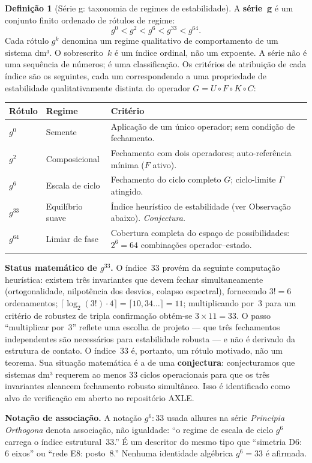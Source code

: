 \documentclass[12pt,a4paper,twoside]{book}
\theoremstyle{plain}
\theoremstyle{definition}
\theoremstyle{definition}
\newtheorem{definicao}[teorema]{Definição}
\begin{document}
\begin{definicao}[Série g: taxonomia de regimes de estabilidade]\label{def:g-series}
A \textbf{série~g} é um conjunto finito ordenado de rótulos de regime:
\[
  g^{0} < g^{2} < g^{6} < g^{33} < g^{64}.
\]
Cada rótulo $g^{k}$ denomina um regime qualitativo de comportamento de um sistema dm³.
O sobrescrito~$k$ é um índice ordinal, não um expoente. A série não é uma sequência
de números; é uma classificação. Os critérios de atribuição de cada índice são os
seguintes, cada um correspondendo a uma propriedade de estabilidade qualitativamente
distinta do operador $G = U \circ F \circ K \circ C$:

\medskip
\begin{center}
\small
\begin{tabular}{@{}lll@{}}
\toprule
\textbf{Rótulo} & \textbf{Regime} & \textbf{Critério} \\
\midrule
$g^{0}$ & Semente &
  Aplicação de um único operador; sem condição de fechamento. \\[3pt]
$g^{2}$ & Composicional &
  Fechamento com dois operadores; auto-referência mínima ($F$ ativo). \\[3pt]
$g^{6}$ & Escala de ciclo &
  Fechamento do ciclo completo $G$; ciclo-limite $\Gamma$ atingido. \\[3pt]
$g^{33}$ & Equilíbrio suave &
  Índice heurístico de estabilidade (ver Observação abaixo). \emph{Conjectura.} \\[3pt]
$g^{64}$ & Limiar de fase &
  Cobertura completa do espaço de possibilidades: $2^{6} = 64$
  combinações operador--estado. \\
\bottomrule
\end{tabular}
\end{center}

\medskip
\noindent\textbf{Status matemático de $g^{33}$.}
O índice~33 provém da seguinte computação heurística: existem três invariantes que
devem fechar simultaneamente (ortogonalidade, nilpotência dos desvios, colapso
espectral), fornecendo $3! = 6$ ordenamentos; $\lceil \log_{2}(3!)\cdot 4 \rceil =
\lceil 10{,}34\ldots \rceil = 11$; multiplicando por~3 para um critério de robustez
de tripla confirmação obtém-se $3 \times 11 = 33$. O passo ``multiplicar por~3''
reflete uma escolha de projeto --- que três fechamentos independentes são necessários
para estabilidade robusta --- e não é derivado da estrutura de contato. O índice~33
é, portanto, um rótulo motivado, não um teorema. Sua situação matemática é a de uma
\textbf{conjectura}: conjecturamos que sistemas dm³ requerem ao menos 33 ciclos
operacionais para que os três invariantes alcancem fechamento robusto simultâneo.
Isso é identificado como alvo de verificação em aberto no repositório AXLE.

\medskip
\noindent\textbf{Notação de associação.}
A notação $g^{6}\!:\!33$ usada alhures na série \emph{Principia Orthogona} denota
associação, não igualdade: ``o regime de escala de ciclo $g^{6}$ carrega o índice
estrutural~33.'' É um descritor do mesmo tipo que ``simetria D6: 6 eixos'' ou
``rede E8: posto~8.'' Nenhuma identidade algébrica $g^{6} = 33$ é afirmada.
\end{definicao}
\end{document}
